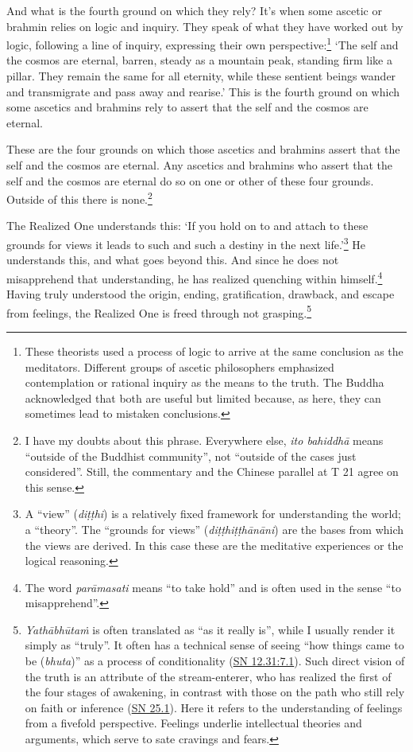 \documentclass[12pt,openany]{book}%
\begin{document}
And what is the fourth ground on which they rely? It’s when some ascetic or brahmin relies on logic and inquiry. They speak of what they have worked out by logic, following a line of inquiry, expressing their own perspective:\footnote{These theorists used a process of logic to arrive at the same conclusion as the meditators. Different groups of ascetic philosophers emphasized contemplation or rational inquiry as the means to the truth. The Buddha acknowledged that both are useful but limited because, as here, they can sometimes lead to mistaken conclusions. } ‘The self and the cosmos are eternal, barren, steady as a mountain peak, standing firm like a pillar. They remain the same for all eternity, while these sentient beings wander and transmigrate and pass away and rearise.’ This is the fourth ground on which some ascetics and brahmins rely to assert that the self and the cosmos are eternal. 

These are the four grounds on which those ascetics and brahmins assert that the self and the cosmos are eternal. Any ascetics and brahmins who assert that the self and the cosmos are eternal do so on one or other of these four grounds. Outside of this there is none.\footnote{I have my doubts about this phrase. Everywhere else, \textit{ito \textsanskrit{bahiddhā}} means “outside of the Buddhist community”, not “outside of the cases just considered”. Still, the commentary and the Chinese parallel at T 21 agree on this sense. } 

The Realized One understands this: ‘If you hold on to and attach to these grounds for views it leads to such and such a destiny in the next life.’\footnote{A “view” (\textit{\textsanskrit{diṭṭhi}}) is a relatively fixed framework for understanding the world; a “theory”. The “grounds for views” (\textit{\textsanskrit{diṭṭhiṭṭhānāni}}) are the bases from which the views are derived. In this case these are the meditative experiences or the logical reasoning. } He understands this, and what goes beyond this. And since he does not misapprehend that understanding, he has realized quenching within himself.\footnote{The word \textit{\textsanskrit{parāmasati}} means “to take hold” and is often used in the sense “to misapprehend”. } Having truly understood the origin, ending, gratification, drawback, and escape from feelings, the Realized One is freed through not grasping.\footnote{\textit{\textsanskrit{Yathābhūtaṁ}} is often translated as “as it really is”, while I usually render it simply as “truly”. It often has a technical sense of seeing “how things came to be (\textit{bhuta})” as a process of conditionality (\href{https://suttacentral.net/sn12.31/en/sujato\#7.1}{SN 12.31:7.1}). Such direct vision of the truth is an attribute of the stream-enterer, who has realized the first of the four stages of awakening, in contrast with those on the path who still rely on faith or inference (\href{https://suttacentral.net/sn25.1/en/sujato}{SN 25.1}). Here it refers to the understanding of feelings from a fivefold perspective. Feelings underlie intellectual theories and arguments, which serve to sate cravings and fears. } 
\end{document}
